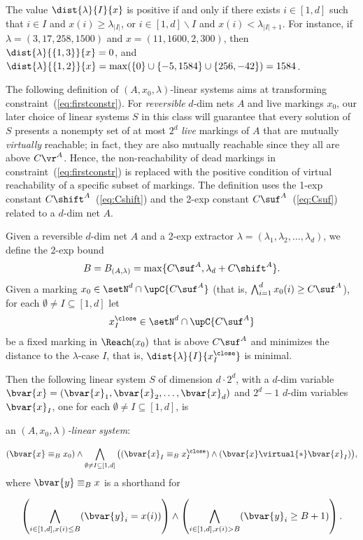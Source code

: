 \noindent
The value $\dist{\lambda}{I}{x}$ is positive if
and only if there exists
$i\in [1,d]$ such that $i\in I$ and $x(i)\geq \lambda_{|I|}$, or
$i\in[1,d]\smallsetminus I$ and $x(i)<\lambda_{|I|+1}$.
For instance, if $\lambda=(3,17,258,1500)$ and $x=(11,1600,2,300)$,
then $\dist{\lambda}{\{1,3\}}{x}=0$, 
and
$\dist{\lambda}{\{1,2\}}{x}=\max(\{0\}\cup\{-5,1584\}\cup\{256,-42\})=1584$. 

\smallskip

The following definition of $(A,x_0,\lambda)$-linear systems aims at
transforming
 constraint~(\ref{eq:firstconstr}). 
For  \emph{reversible} $d$-dim nets $A$ and live 
markings $x_0$, 
our later choice of linear systems $S$
in this class will guarantee that 
every solution of $S$ presents
a nonempty set of at most $2^d$ \emph{live} markings of $A$ that are mutually \emph{virtually} reachable; in
fact, they are also mutually reachable since they all are above $C\vr^A$.
Hence, the non-reachability of dead markings in 
constraint~(\ref{eq:firstconstr}) is replaced with the positive
condition of virtual reachability of a specific subset of markings. 
The definition uses the 1-exp constant $C\shift^A$~(\ref{eq:Cshift}) and the 2-exp
constant $C\suf^A$~(\ref{eq:Csuf}) 
related to a $d$-dim
net $A$.

\begin{defi}\label{def:crucialLS}
Given a reversible $d$-dim net $A$ and a 2-exp extractor
	$\lambda=(\lambda_1,\lambda_2,\dots,\lambda_d)$,
	we define
the 2-exp bound	\begin{equation}\label{eq:BAffnets}
	B=B_{(A,\lambda)}=\max\{C\suf^A,\lambda_d+C\shift^A\}.
	\end{equation}
	Given a marking $x_0\in\setN^d\cap\upC{C\suf^A}$ (that is, 
	$\bigwedge_{i=1}^d x_0(i)\geq C\suf^A$), for each $\emptyset\neq I\subseteq[1,d]$ let 
	\[x^\close_I\in \setN^d\cap\upC{C\suf^A}\]
	be a fixed marking in $\Reach(x_0)$
	that is above $C\suf^A$ and minimizes the distance to
	the $\lambda$-case $I$, that is, $\dist{\lambda}{I}{x^\close_I}$ is
	minimal. 

Then the following 
linear system $S$ of dimension $d\cdot 2^d$, with
	a $d$-dim variable
	$\bvar{x}=(\bvar{x}_1,\bvar{x}_2,\dots,\bvar{x}_d)$ and $2^d-1$ $d$-dim variables 
	$\bvar{x}_I$, one for each $\emptyset\neq I\subseteq[1,d]$,
	is 
	\begin{center}
		an \emph{$(A,x_0,\lambda)$-linear system}:
	\end{center}		
\begin{equation}\label{eq:AxLS}
	(\bvar{x}\equiv_B x_0)
	\land
	\bigwedge_{\emptyset\neq I\subseteq[1,d]}\big((\bvar{x}_I\equiv_B x^\close_I)\land
	(\bvar{x}\virtual{*}\bvar{x}_I)\big),
\end{equation}
	where $\bvar{y}\equiv_B x$ is a shorthand for 

	\[\left(\bigwedge_{i\in[1,d], x(i)\leq B}
	(\bvar{y}_i=x(i))\right)\land 
	\left(\bigwedge_{i\in[1,d], x(i)> B} (\bvar{y}_i\geq
	B+1)\right).\]
\end{defi}	

